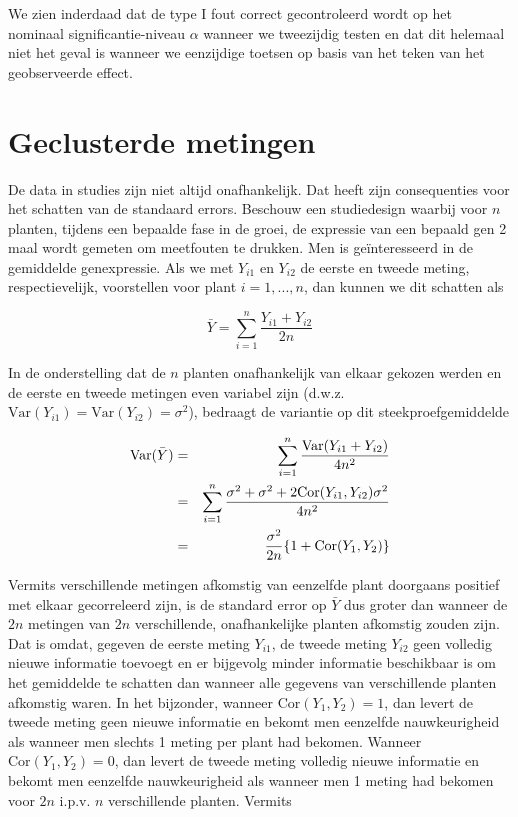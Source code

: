 \documentclass[
  dutch,
  letterpaper,
  12pt]{book}
\theoremstyle{definition}
\theoremstyle{definition}
\theoremstyle{definition}
\theoremstyle{remark}
\begin{document}
We zien inderdaad dat de type I fout correct gecontroleerd wordt op het
nominaal significantie-niveau \(\alpha\) wanneer we tweezijdig testen en
dat dit helemaal niet het geval is wanneer we eenzijdige toetsen op
basis van het teken van het geobserveerde effect.

\section{Geclusterde metingen}\label{geclusterde-metingen}

De data in studies zijn niet altijd onafhankelijk. Dat heeft zijn
consequenties voor het schatten van de standaard errors. Beschouw een
studiedesign waarbij voor \(n\) planten, tijdens een bepaalde fase in de
groei, de expressie van een bepaald gen 2 maal wordt gemeten om
meetfouten te drukken. Men is geïnteresseerd in de gemiddelde
genexpressie. Als we met \(Y_{i1}\) en \(Y_{i2}\) de eerste en tweede
meting, respectievelijk, voorstellen voor plant \(i=1,...,n\), dan
kunnen we dit schatten als

\begin{equation*}
\bar Y = \sum_{i=1}^n \frac{Y_{i1}+Y_{i2}}{2n}
\end{equation*}

In de onderstelling dat de \(n\) planten onafhankelijk van elkaar
gekozen werden en de eerste en tweede metingen even variabel zijn
(d.w.z. \(\text{Var}(Y_{i1})=\text{Var}(Y_{i2})=\sigma^2\)), bedraagt de
variantie op dit steekproefgemiddelde

\begin{eqnarray*}
\text{Var}(\bar Y)&=&\sum_{i=1}^n \frac{\text{Var}(Y_{i1}+Y_{i2})}{4n^2} \\
&=&\sum_{i=1}^n \frac{\sigma^2+\sigma^2+2\text{Cor}(Y_{i1},Y_{i2})\sigma^2}{%
4n^2} \\
&=&\frac{\sigma^2}{2n}\{1+\text{Cor}(Y_{1},Y_{2})\}
\end{eqnarray*}

Vermits verschillende metingen afkomstig van eenzelfde plant doorgaans
positief met elkaar gecorreleerd zijn, is de standard error op
\(\bar Y\) dus groter dan wanneer de \(2n\) metingen van \(2n\)
verschillende, onafhankelijke planten afkomstig zouden zijn. Dat is
omdat, gegeven de eerste meting \(Y_{i1}\), de tweede meting \(Y_{i2}\)
geen volledig nieuwe informatie toevoegt en er bijgevolg minder
informatie beschikbaar is om het gemiddelde te schatten dan wanneer alle
gegevens van verschillende planten afkomstig waren. In het bijzonder,
wanneer \(\text{Cor}(Y_{1},Y_{2})=1\), dan levert de tweede meting geen
nieuwe informatie en bekomt men eenzelfde nauwkeurigheid als wanneer men
slechts 1 meting per plant had bekomen. Wanneer
\(\text{Cor}(Y_{1},Y_{2})=0\), dan levert de tweede meting volledig
nieuwe informatie en bekomt men eenzelfde nauwkeurigheid als wanneer men
1 meting had bekomen voor \(2n\) i.p.v. \(n\) verschillende planten.
Vermits
\end{document}
